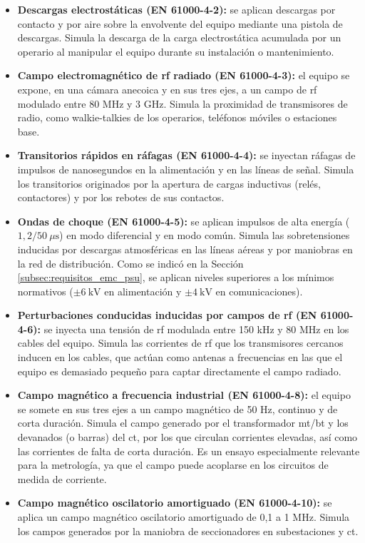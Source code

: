 \begin{itemize}
    \item \textbf{Descargas electrostáticas (EN 61000-4-2):} se aplican descargas por contacto y por aire sobre la envolvente del equipo mediante una pistola de descargas. Simula la descarga de la carga electrostática acumulada por un operario al manipular el equipo durante su instalación o mantenimiento.
    \item \textbf{Campo electromagnético de \gls{rf} radiado (EN 61000-4-3):} el equipo se expone, en una cámara anecoica y en sus tres ejes, a un campo de \gls{rf} modulado entre 80 MHz y 3 GHz. Simula la proximidad de transmisores de radio, como walkie-talkies de los operarios, teléfonos móviles o estaciones base.
    \item \textbf{Transitorios rápidos en ráfagas (EN 61000-4-4):} se inyectan ráfagas de impulsos de nanosegundos en la alimentación y en las líneas de señal. Simula los transitorios originados por la apertura de cargas inductivas (relés, contactores) y por los rebotes de sus contactos.
    \item \textbf{Ondas de choque (EN 61000-4-5):} se aplican impulsos de alta energía ($1,2/50\ \mu\text{s}$) en modo diferencial y en modo común. Simula las sobretensiones inducidas por descargas atmosféricas en las líneas aéreas y por maniobras en la red de distribución. Como se indicó en la Sección \ref{subsec:requisitos_emc_psu}, se aplican niveles superiores a los mínimos normativos ($\pm 6\ \text{kV}$ en alimentación y $\pm 4\ \text{kV}$ en comunicaciones).
    \item \textbf{Perturbaciones conducidas inducidas por campos de \gls{rf} (EN 61000-4-6):} se inyecta una tensión de \gls{rf} modulada entre 150 kHz y 80 MHz en los cables del equipo. Simula las corrientes de \gls{rf} que los transmisores cercanos inducen en los cables, que actúan como antenas a frecuencias en las que el equipo es demasiado pequeño para captar directamente el campo radiado.
    \item \textbf{Campo magnético a frecuencia industrial (EN 61000-4-8):} el equipo se somete en sus tres ejes a un campo magnético de 50 Hz, continuo y de corta duración. Simula el campo generado por el transformador \gls{mt}/\gls{bt} y los devanados (o barras) del \gls{ct}, por los que circulan corrientes elevadas, así como las corrientes de falta de corta duración. Es un ensayo especialmente relevante para la metrología, ya que el campo puede acoplarse en los circuitos de medida de corriente.
    \item \textbf{Campo magnético oscilatorio amortiguado (EN 61000-4-10):} se aplica un campo magnético oscilatorio amortiguado de 0,1 a 1 MHz. Simula los campos generados por la maniobra de seccionadores en subestaciones y \gls{ct}.

\end{itemize}

